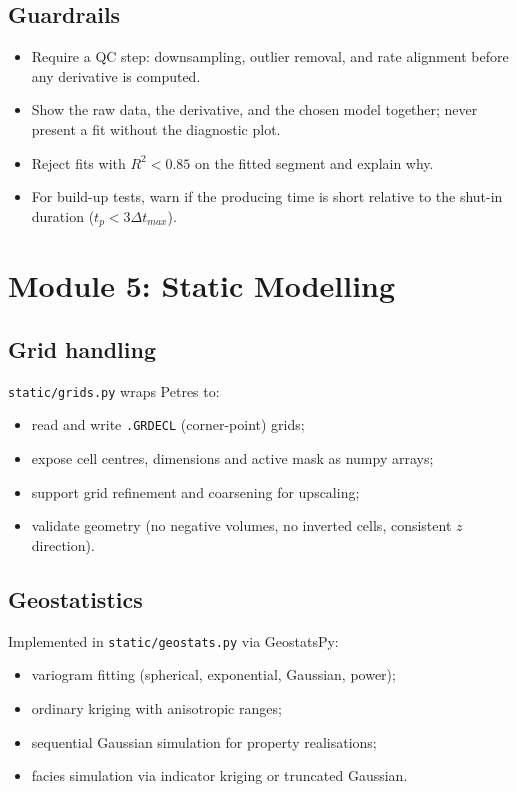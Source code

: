 \documentclass[11pt,a4paper]{article}
\newcommand{\code}[1]{\texttt{#1}}
\begin{document}
\subsection{Guardrails}
\begin{itemize}[leftmargin=1.4em]
  \item Require a QC step: downsampling, outlier removal, and rate alignment
        before any derivative is computed.
  \item Show the raw data, the derivative, and the chosen model together; never
        present a fit without the diagnostic plot.
  \item Reject fits with $R^2 < 0.85$ on the fitted segment and explain why.
  \item For build-up tests, warn if the producing time is short relative to the
        shut-in duration ($t_p < 3 \Delta t_{max}$).
\end{itemize}

\section{Module 5: Static Modelling}

\subsection{Grid handling}
\code{static/grids.py} wraps Petres to:
\begin{itemize}[leftmargin=1.4em]
  \item read and write \code{.GRDECL} (corner-point) grids;
  \item expose cell centres, dimensions and active mask as numpy arrays;
  \item support grid refinement and coarsening for upscaling;
  \item validate geometry (no negative volumes, no inverted cells, consistent
        $z$ direction).
\end{itemize}

\subsection{Geostatistics}
Implemented in \code{static/geostats.py} via GeostatsPy:
\begin{itemize}[leftmargin=1.4em]
  \item variogram fitting (spherical, exponential, Gaussian, power);
  \item ordinary kriging with anisotropic ranges;
  \item sequential Gaussian simulation for property realisations;
  \item facies simulation via indicator kriging or truncated Gaussian.
\end{itemize}
\end{document}
